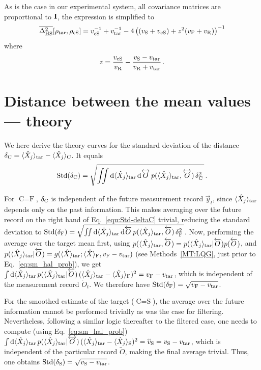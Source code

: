 \documentclass[aps,prx,onecolumn,superscriptaddress,floatfix,longbibliography,amsmath,amssymb]{revtex4-2}
\newcommand{\ellipse}{\raisebox{-1pt}{\scalebox{1.3}[.4]{$\circ$}}}
\newcommand{\halo}{\accentset{\ellipse}}
\newcommand{\fil}{_{\text F}}
\newcommand{\rfil}{_{\text R}}
\newcommand{\sm}{_{\text S}}
\newcommand{\csm}{_{\rm cS}}
\newcommand{\tar}{_{\rm tar}}
\newcommand{\dd}{{\rm d}}
\newcommand{\ex}[1]{\langle #1 \rangle}
\newcommand{\past}[1]{\overleftarrow{#1}}%
\newcommand{\fut}[1]{\overrightarrow{#1}}
\newcommand{\both}[1]{\overleftrightarrow{#1}}
\newcommand{\inv}{^{-1}}
\newcommand{\beq}{\begin{equation}}
\newcommand{\eeq}{\end{equation}}
\begin{document}
As is the case in our experimental system, all covariance matrices are proportional to ${\bf I}$, the expression is simplified to
\beq
\overline{\Delta^2_{\rm HS}}[\rho_{\rm tar},\rho_{\rm cS}] =  v_{\rm cS}^{-1} + v_{\rm tar}^{-1} - 4\left((v\sm+v\csm) + z^2 (v\fil+v\rfil)\right)\inv
\eeq
where 
\beq
z = \frac{v_{\rm cS}}{v\rfil} - \frac{v\sm - v\tar}{v\rfil + v\tar}\,.
\eeq

\section{Distance between the mean values --- theory}

We here derive the theory curves for the standard deviation of the distance $\delta_\text{C} = \ex{\hat{X}_j}_{\rm tar}-\ex{\hat{X}_j}_{\rm C}$. It equals
\beq
{\rm Std}(\delta_\text{C}) = \sqrt{\iint \dd \ex{\hat{X}_j}_{\rm tar}\,\dd\both{O}\,p(\ex{\hat{X}_j}_{\rm tar},\both{O})\,\delta_\text{C}^2\,}\,.
\label{equ:Std-deltaC}
\eeq

For $\text{C}=\text{F}$, $\delta_{\rm C}$ is independent of the 
future measurement record $\fut{y}_t$, since $\ex{\hat{X}_j}\tar$ depends only on the past information. This makes averaging over the future record on the right hand of Eq.~\eqref{equ:Std-deltaC} trivial, reducing the standard deviation to ${\rm Std}(\delta_{\text{F}}) = \sqrt{\iint \dd \ex{\hat{X}_j}\tar\,\dd\past{O} \,p(\ex{\hat{X}_j}\tar,\past{O})\,\delta_{\text{F}}^2\,}$. 
Now, performing the average over the target mean first, using $p(\ex{\hat{X}_j}\tar,\past{O}) = p(\ex{\hat{X}_j}\tar|\past{O})p(\past{O})$, and $p(\ex{\hat{X}_j}\tar|\past{O}) = g(\ex{\hat{X}}\tar;\ex{\hat{X}}\fil,v\fil - v\tar)$ (see Methods~\ref{MT:LQG}, just prior to Eq.~\eqref{eq:sm_hal_prob}), we get $\int\dd\ex{\hat{X}_j}\tar\,p(\ex{\hat{X}_j}\tar|\past{O}) \,(\ex{\hat{X}_j}\tar-\ex{\hat{X}_j}_{\rm F})^2 = v\fil - v\tar$, which is independent of the measurement record $\past{O}_t$. We therefore have ${\rm Std}(\delta_{\text{F}}) = \sqrt{v\fil - v\tar}$.

For the smoothed estimate of the target ($\text{C}=\text{S}$), the average over the future information cannot be performed trivially as was the case for filtering. Nevertheless, following a similar logic thereafter to the filtered case, one needs to compute (using Eq.~\eqref{eq:sm_hal_prob}) $\int\dd\ex{\hat{X}_j}\tar\, p(\ex{\hat{X}_j}\tar|\both{O})\,(\ex{\hat{X}_j}\tar-\ex{\hat{X}_j}_{\rm S})^2 = \halo{v}\sm = v\sm - v\tar$, which is independent of the particular record $\both{O}$, making the final average trivial. Thus, one obtains ${\rm Std}(\delta_{\text{S}}) = \sqrt{v\sm - v_{\rm tar}}$.
\end{document}
